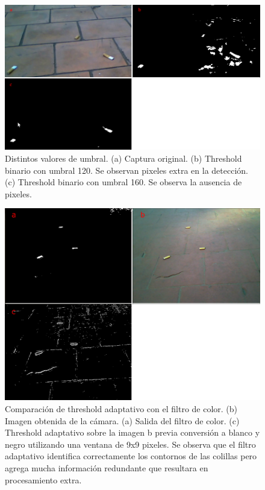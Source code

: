 \begin{figure}[tpb]
\begin{center}
  \includegraphics[scale=0.4]{vision/figures/threshold-dif.png}
\end{center}
  \caption[Distintos valores de umbral]{\small Distintos valores de umbral. (a) Captura original. 
  (b) Threshold binario con umbral 120. Se observan pixeles extra en 
  la detecci\'on. (c) Threshold binario con umbral 160. Se observa la 
  ausencia de pixeles. }
  \label{fig:thresh-dif}
\end{figure}

\begin{figure}[tpb]
\begin{center}
  \includegraphics[scale=0.25]{vision/figures/adaptative.png}
\end{center}
  \caption[Comparaci\'on threshold con filtro de color]{\small Comparaci\'on de threshold adaptativo con el filtro de 
  color. (b) Imagen obtenida de la c\'amara. 
  (a) Salida del filtro de color. (c) Threshold adaptativo sobre la 
  imagen b previa conversi\'on a blanco y negro utilizando una ventana 
  de 9x9 pixeles. Se observa que el filtro adaptativo identifica 
  correctamente los contornos de las colillas pero agrega mucha 
  informaci\'on redundante que resultara en procesamiento extra.}
  \label{fig:thresh_adapt}
\end{figure}


